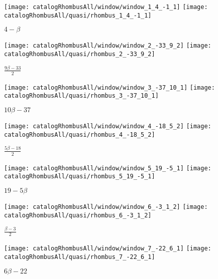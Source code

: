 \documentclass[text.tex]{subfiles}
\begin{document}
\pagestyle{empty}
\begin{landscape}
\begin{figure}[h]
\centering
\texttt{[image: catalogRhombusAll/window/window\_1\_4\_-1\_1]}
\texttt{[image: catalogRhombusAll/quasi/rhombus\_1\_4\_-1\_1]}
\caption*{$4-\beta$}
\end{figure}

\begin{figure}[h]
\centering
\texttt{[image: catalogRhombusAll/window/window\_2\_-33\_9\_2]}
\texttt{[image: catalogRhombusAll/quasi/rhombus\_2\_-33\_9\_2]}
\caption*{$\frac{9\beta-33}{2}$}
\end{figure}

\begin{figure}[h]
\centering
\texttt{[image: catalogRhombusAll/window/window\_3\_-37\_10\_1]}
\texttt{[image: catalogRhombusAll/quasi/rhombus\_3\_-37\_10\_1]}
\caption*{$10\beta-37$}
\end{figure}

\begin{figure}[h]
\centering
\texttt{[image: catalogRhombusAll/window/window\_4\_-18\_5\_2]}
\texttt{[image: catalogRhombusAll/quasi/rhombus\_4\_-18\_5\_2]}
\caption*{$\frac{5\beta-18}{2}$}
\end{figure}

\begin{figure}[h]
\centering
\texttt{[image: catalogRhombusAll/window/window\_5\_19\_-5\_1]}
\texttt{[image: catalogRhombusAll/quasi/rhombus\_5\_19\_-5\_1]}
\caption*{$19-5\beta$}
\end{figure}

\thispagestyle{empty}
\begin{figure}[h]
\centering
\texttt{[image: catalogRhombusAll/window/window\_6\_-3\_1\_2]}
\texttt{[image: catalogRhombusAll/quasi/rhombus\_6\_-3\_1\_2]}
\caption*{$\frac{\beta-3}{2}$}
\end{figure}

\begin{figure}[h]
\centering
\texttt{[image: catalogRhombusAll/window/window\_7\_-22\_6\_1]}
\texttt{[image: catalogRhombusAll/quasi/rhombus\_7\_-22\_6\_1]}
\caption*{$6\beta-22$}
\end{figure}


\end{landscape}
\end{document}
